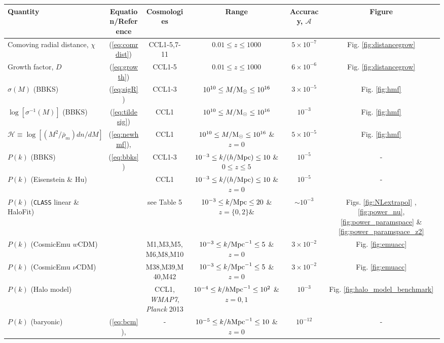 
%
\begin{sidewaystable*}[!htp]
  \centering
  \begin{tabular}{ l|c c c c c}
    \hline
    Quantity & Equation/Reference & Cosmologies & Range & Accuracy, $\mathcal{A}$ & Figure \\
    \hline
    Comoving radial distance, $\chi$ & (\ref{eq:comrdist}) & CCL1-5,7-11 & $0.01 \leq z\leq 1000$ &  $5\times 10^{-7}$ & Fig. \ref{fig:distancegrow}\\
    Growth factor, $D$ & (\ref{eq:growth}) & CCL1-5 &  $0.01 \leq z\leq 1000 $ &  $6\times 10^{-6}$ & Fig. \ref{fig:distancegrow}\\
    $\sigma(M)$ (BBKS) & (\ref{eq:sigR}) & CCL1-3 &  $10^{10}\leq M/{\rm M}_\odot\leq 10^{16}$ &  $3\times 10^{-5}$ & Fig. \ref{fig:hmf}\\
    $\log[\sigma^{-1}(M)]$ (BBKS) & (\ref{eq:tildesig}) & CCL1 &  $10^{10}\leq M/{\rm M}_\odot\leq 10^{16}$ &  $10^{-3}$ & Fig. \ref{fig:hmf}\\
    $\mathcal H \equiv \log[(M^2/\bar{\rho}_m)dn/dM]$  & (\ref{eq:newhmf}), \citet{Tinker2010} & CCL1 & $10^{10}\leq M/{\rm M}_\odot\leq 10^{16}$ \& $z=0$ & $5\times 10^{-5}$ & Fig. \ref{fig:hmf}\\
    $P(k)$ (BBKS) & (\ref{eq:bbks}) & CCL1-3 & $10^{-3}\leq k/(h/{\rm Mpc})\leq 10$ \& $0\leq z\leq 5$ &  $10^{-5}$ & -\\
    $P(k)$ (Eisenstein \& Hu) & \citet{1998ApJ...496..605E}  & CCL1 & $10^{-3}\leq k/(h/{\rm Mpc})\leq 10$ \& $z=0$ & $10^{-5}$ & -\\
    $P(k)$ ({\tt CLASS} linear \& HaloFit) & \citet{CLASS_halofit}  & see Table 5 & $10^{-3}\leq k/{\rm Mpc}\leq 20$ \& $z=\{0,2\}$\&  & $\sim 10^{-3}$ & Figs. \ref{fig:NLextrapol} , \ref{fig:power_nu}, \ref{fig:power_paramspace} \& \ref{fig:power_paramspace_z2} \\
    $P(k)$ (CosmicEmu $w$CDM) & \citet{Lawrence17} & M1,M3,M5,M6,M8,M10 & $10^{-3}\leq k/{\rm Mpc}^{-1}\leq 5$ \& $z=0$  & $3\times 10^{-2}$ & Fig. \ref{fig:emuacc}\\
    $P(k)$ (CosmicEmu $\nu$CDM) & \citet{Lawrence17} & M38,M39,M40,M42 & $10^{-3}\leq k/{\rm Mpc}^{-1}\leq 5$ \& $z=0$ & $3\times 10^{-2}$ & Fig. \ref{fig:emuacc}\\
    $P(k)$ (Halo model) & \citet{Cooray2002} & CCL1, {\it WMAP7}, {\it Planck} 2013 & $10^{-4}\leq k/h{\rm Mpc}^{-1}\leq 10^{2}$ \& $z=0,1$ & $10^{-3}$ & Fig. \ref{fig:halo_model_benchmark}\\
    $P(k)$ (baryonic) & (\ref{eq:bcm}), \citet{Schneider15} &  - & $10^{-5}\leq k/h{\rm Mpc}^{-1}\leq 10$ \& $z=0$ & $10^{-12}$ & -\\

\end{tabular}
\end{sidewaystable*}
